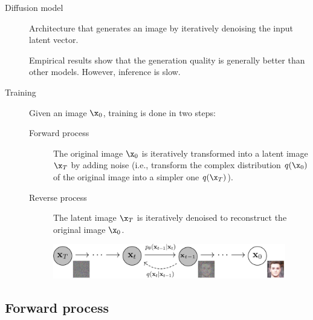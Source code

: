 \begin{description}
    \item[Diffusion model] 
        Architecture that generates an image by iteratively denoising the input latent vector.

        \begin{remark}
            Empirical results show that the generation quality is generally better than other models. However, inference is slow.
        \end{remark}

    \item[Training]
        Given an image $\x_0$, training is done in two steps:
        \begin{description}
            \item[Forward process] 
                The original image $\x_0$ is iteratively transformed into a latent image $\x_T$ by adding noise (i.e., transform the complex distribution $q(\x_0)$ of the original image into a simpler one $q(\x_T)$).
            \item[Reverse process] 
                The latent image $\x_T$ is iteratively denoised to reconstruct the original image $\x_0$.
        \end{description} 

        \begin{figure}[H]
            \centering
            \includegraphics[width=0.8\linewidth]{./img/diffusion_model.jpg}
        \end{figure}
\end{description}


\subsection{Forward process}

